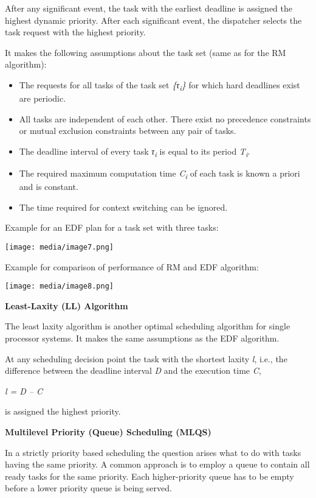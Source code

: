 After any significant event, the task with the earliest deadline is
assigned the highest dynamic priority. After each significant event, the
dispatcher selects the task request with the highest priority.

It makes the following assumptions about the task set (same as for the
RM algorithm):

\begin{itemize}
\item
  The requests for all tasks of the task set
  \emph{\{τ\textsubscript{i}\}} for which hard deadlines exist are
  periodic.
\item
  All tasks are independent of each other. There exist no precedence
  constraints or mutual exclusion constraints between any pair of tasks.
\item
  The deadline interval of every task \emph{τ\textsubscript{i}} is equal
  to its period \emph{T\textsubscript{i}}.
\item
  The required maximum computation time \emph{C\textsubscript{i}} of
  each task is known a priori and is constant.
\item
  The time required for context switching can be ignored.
\end{itemize}

Example for an EDF plan for a task set with three tasks:

\texttt{[image: media/image7.png]}

Example for comparison of performance of RM and EDF algorithm:

\texttt{[image: media/image8.png]}

\textbf{Least-Laxity (LL) Algorithm}

The least laxity algorithm is another optimal scheduling algorithm for
single processor systems. It makes the same assumptions as the EDF
algorithm.

At any scheduling decision point the task with the shortest laxity
\emph{l}, i.e., the difference between the deadline interval \emph{D}
and the execution time \emph{C},

\emph{l = D -- C}

is assigned the highest priority.

\textbf{Multilevel Priority (Queue) Scheduling (MLQS)}

In a strictly priority based scheduling the question arises what to do
with tasks having the same priority. A common approach is to employ a
queue to contain all ready tasks for the same priority. Each
higher-priority queue has to be empty before a lower priority queue is
being served.

